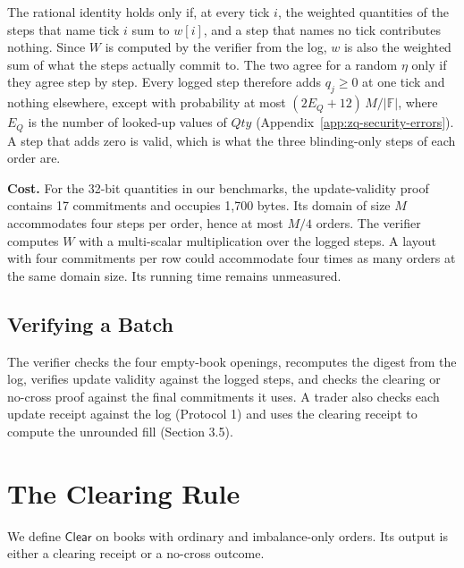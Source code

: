 The rational identity holds only if, at every tick \(i\), the weighted quantities of the steps that name tick \(i\) sum to \(w[i]\), and a step that names no tick contributes nothing. Since \(W\) is computed by the verifier from the log, \(w\) is also the weighted sum of what the steps actually commit to. The two agree for a random \(\eta\) only if they agree step by step. Every logged step therefore adds \(q_j \ge 0\) at one tick and nothing elsewhere, except with probability at most \((2E_Q + 12)\,M/|\mathbb{F}|\), where \(E_Q\) is the number of looked-up values of \(Qty\) (Appendix~\ref{app:zq-security-errors}). A step that adds zero is valid, which is what the three blinding-only steps of each order are.

\textbf{Cost.} For the 32-bit quantities in our benchmarks, the update-validity proof contains 17 commitments and occupies 1,700 bytes. Its domain of size \(M\) accommodates four steps per order, hence at most \(M/4\) orders. The verifier computes \(W\) with a multi-scalar multiplication over the logged steps. A layout with four commitments per row could accommodate four times as many orders at the same domain size. Its running time remains unmeasured.

\subsection{Verifying a Batch}

The verifier checks the four empty-book openings, recomputes the digest from the log, verifies update validity against the logged steps, and checks the clearing or no-cross proof against the final commitments it uses. A trader also checks each update receipt against the log (Protocol 1) and uses the clearing receipt to compute the unrounded fill (Section 3.5).











\section{The Clearing Rule}
\label{app:zq-clearing-rule}

We define \(\mathsf{Clear}\) on books with ordinary and imbalance-only orders. Its output is either a clearing receipt or a no-cross outcome.

